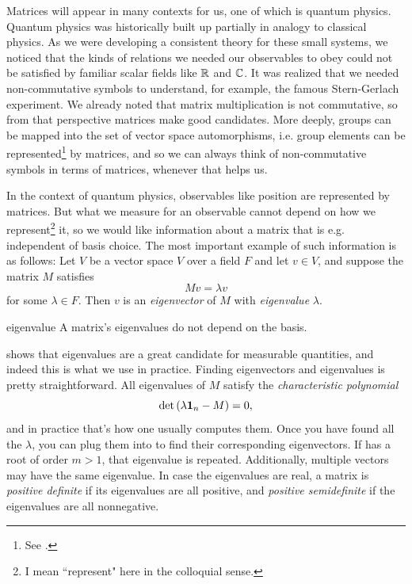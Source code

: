 Matrices will appear in many contexts for us, one of which
is quantum physics. Quantum physics was historically built up partially in
analogy to classical physics. As we were developing a consistent theory for these
small systems, we noticed that the kinds of relations we needed our observables
to obey could not be satisfied by familiar scalar fields like $\mathbb{R}$ and $\mathbb{C}$.
It was realized that we needed non-commutative symbols to understand,
for example, the famous Stern-Gerlach experiment. We already noted that matrix
multiplication is not commutative, so from that perspective matrices make good
candidates. More deeply, groups can be mapped into the set of
vector space automorphisms,
i.e. group elements can be 
represented\footnote{See .} by matrices,
and so we can always think of non-commutative symbols in terms of matrices,
whenever that helps us.

In the context of quantum physics, observables like position are represented by
matrices. But what we measure for an observable cannot depend on how we
represent\footnote{I mean ``represent" here in the colloquial sense.} it,
so we would like information about a matrix that is e.g. independent of
basis choice. The most important example of such information is as follows:
Let $V$ be a vector space $V$ over a field $F$ and let $v\in V$,
and suppose the matrix $M$ satisfies
\begin{equation}\label{eq:eigen}
Mv = \lambda v
\end{equation}
for some $\lambda\in F$. Then $v$ is an {\it eigenvector} 
of $M$ with {\it eigenvalue} $\lambda$.

\begin{proposition}{}{eigenvalue}
  A matrix's eigenvalues do not depend on the basis. 
\end{proposition}

 shows that eigenvalues are a great candidate
for measurable quantities, and indeed this is what we use in practice.
Finding eigenvectors and eigenvalues is pretty straightforward.
All eigenvalues of $M$ satisfy the
{\it characteristic polynomial}
\begin{equation}\label{eq:characteristicPolynomial}
\det\left(\lambda{\mathbf 1}_n-M\right)=0,
\end{equation}
and in practice that's how one usually computes them.
Once you have found all the $\lambda$, you can plug them
into  to find their corresponding
eigenvectors. If 
has a root of order $m>1$, that eigenvalue is repeated.
Additionally, multiple vectors may have the same eigenvalue.
In case the eigenvalues are real, a matrix is
{\it positive definite} 
if its eigenvalues are all positive, and
{\it positive semidefinite} 
if the eigenvalues are all nonnegative.

